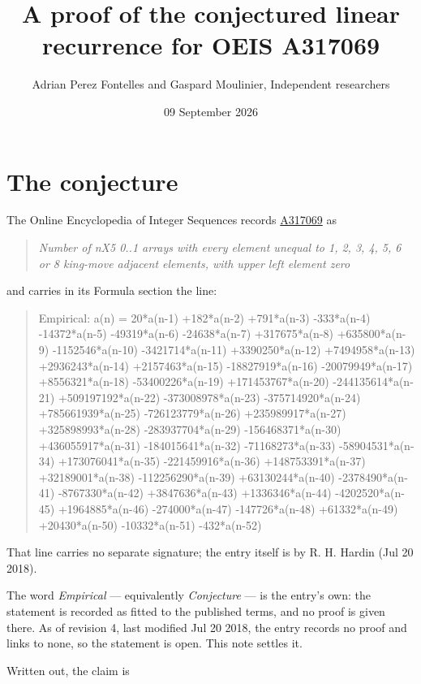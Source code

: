 \documentclass[11pt]{article}
\title{A proof of the conjectured linear recurrence for OEIS A317069}
\author{Adrian Perez Fontelles and Gaspard Moulinier, Independent researchers}
\date{09 September 2026}
\theoremstyle{definition}
\begin{document}
\maketitle
\section{The conjecture}

The Online Encyclopedia of Integer Sequences records \href{https://oeis.org/A317069}{A317069} as

\begin{quote}\itshape Number of nX5 0..1 arrays with every element unequal to 1, 2, 3, 4, 5, 6 or 8 king-move adjacent elements, with upper left element zero\end{quote}

and carries in its Formula section the line:

\begin{quote}\ttfamily Empirical: a(n) = 20*a(n-1) +182*a(n-2) +791*a(n-3) -333*a(n-4) -14372*a(n-5) -49319*a(n-6) -24638*a(n-7) +317675*a(n-8) +635800*a(n-9) -1152546*a(n-10) -3421714*a(n-11) +3390250*a(n-12) +7494958*a(n-13) +2936243*a(n-14) +2157463*a(n-15) -18827919*a(n-16) -20079949*a(n-17) +8556321*a(n-18) -53400226*a(n-19) +171453767*a(n-20) -244135614*a(n-21) +509197192*a(n-22) -373008978*a(n-23) -375714920*a(n-24) +785661939*a(n-25) -726123779*a(n-26) +235989917*a(n-27) +325898993*a(n-28) -283937704*a(n-29) -156468371*a(n-30) +436055917*a(n-31) -184015641*a(n-32) -71168273*a(n-33) -58904531*a(n-34) +173076041*a(n-35) -221459916*a(n-36) +148753391*a(n-37) +32189001*a(n-38) -112256290*a(n-39) +63130244*a(n-40) -2378490*a(n-41) -8767330*a(n-42) +3847636*a(n-43) +1336346*a(n-44) -4202520*a(n-45) +1964885*a(n-46) -274000*a(n-47) -147726*a(n-48) +61332*a(n-49) +20430*a(n-50) -10332*a(n-51) -432*a(n-52)\end{quote}

That line carries no separate signature; the entry itself is by R. H. Hardin (Jul 20 2018).

The word {\itshape Empirical} --- equivalently {\itshape Conjecture} --- is the entry's own: the statement is recorded as fitted to the published terms, and no proof is given there. As of revision 4, last modified Jul 20 2018, the entry records no proof and links to none, so the statement is open. This note settles it.

Written out, the claim is
\end{document}
